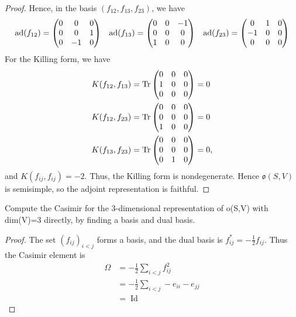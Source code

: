 \documentclass{article}
\DeclareMathOperator{\Id}{Id}
\newcommand{\mf}{\mathfrak}
\begin{document}
\begin{proof}
Hence, in the basis $(f_{12}, f_{13}, f_{23})$, we have
$$
\begin{array}{ccc}
\operatorname{ad}(f_{12}) = \begin{pmatrix} 
0  &  0 & 0  \\ 
0  &  0 & 1  \\
0  & -1 & 0
\end{pmatrix}
&
\operatorname{ad}(f_{13}) = \begin{pmatrix} 
 0 &  0 & -1  \\ 
 0 &  0 &  0  \\
 1 &  0 &  0
\end{pmatrix}
&
\operatorname{ad}(f_{23}) = \begin{pmatrix} 
  0 &  1 &  0  \\ 
 -1 &  0 &  0  \\
  0 &  0 &  0
\end{pmatrix}
\end{array}
$$
For the Killing form, we have
\begin{align*}
K(f_{12}, f_{13}) & = \operatorname{Tr} 
\begin{pmatrix} 
  0 &  0 &  0  \\ 
  1 &  0 &  0  \\
  0 &  0 &  0
\end{pmatrix}
 = 0
\\
K(f_{12}, f_{23}) & = \operatorname{Tr} 
\begin{pmatrix} 
  0 &  0 &  0  \\ 
  0 &  0 &  0  \\
  1 &  0 &  0
\end{pmatrix}
 = 0
\\
K(f_{13}, f_{23}) & = \operatorname{Tr} 
\begin{pmatrix} 
  0 &  0 &  0  \\ 
  0 &  0 &  0  \\
  0 &  1 &  0
\end{pmatrix}
 = 0,
\end{align*}
and
$K(f_{ij}, f_{ij}) = -2$. Thus, the Killing form is nondegenerate. Hence $\mf o(S,V)$ is semisimple, so the adjoint representation is faithful.
\end{proof}
 Compute the Casimir for the 3-dimensional representation of o(S,V) with dim(V)=3 directly, by finding a basis and dual basis.
\begin{proof}
The set $(f_{ij})_{i < j}$ forms a basis, and the dual basis is $f_{ij}^* = -\frac{1}{2} f_{ij}$. Thus the Casimir element is
\begin{align*}
\Omega & = -\frac{1}{2} \sum_{i<j} f_{ij}^2 \\
& = -\frac{1}{2} \sum_{i<j} - e_{ii} - e_{jj} \\
& = \Id 
\end{align*}
\end{proof}
\end{document}
